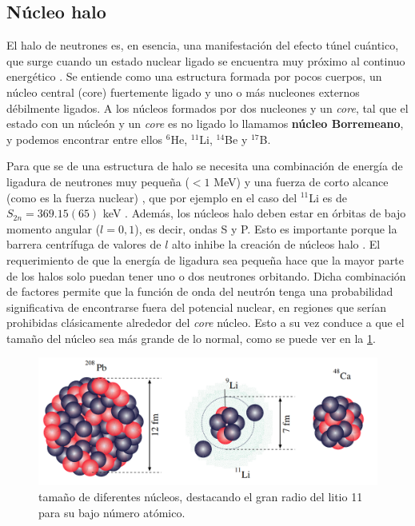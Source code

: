 \subsection{Núcleo halo}


El halo de neutrones es, en esencia, una manifestación del efecto túnel cuántico, que surge cuando un estado nuclear ligado se encuentra muy próximo al continuo energético \cite{tanihata2023halo}.  Se entiende como una estructura formada por pocos cuerpos, un núcleo central (core) fuertemente ligado y uno o más nucleones externos débilmente ligados. A los núcleos formados por dos nucleones y un \textit{core}, tal que el estado con un núcleón y un \textit{core} es no ligado \cite{tanihata2023lowEnergyHalo} lo llamamos \textbf{núcleo Borremeano}, y podemos encontrar entre ellos $^6$He, $^{11}$Li, $^{14}$Be y $^{17}$B. 



Para que se de una estructura de halo se necesita una combinación de energía de ligadura de neutrones muy pequeña ($<1$ MeV) y una fuerza de corto alcance (como es la fuerza nuclear) \cite{tanihata2023halo}, que por ejemplo en el caso del $^{11}$Li es de $S_{2n}=369.15(65)$ keV \cite{PhysRevLett.101.202501}. Además, los núcleos halo deben estar en órbitas de bajo momento angular ($l =0,1$), es decir, ondas S y P. Esto es importante porque la barrera centrífuga de valores de $l$ alto inhibe la creación de núcleos halo \cite{tanihata2023halo}. El requerimiento de que la energía de ligadura sea pequeña hace que la mayor parte de los halos solo puedan tener uno o dos neutrones orbitando. Dicha combinación de factores permite que la función de onda del neutrón tenga una probabilidad significativa de encontrarse fuera del potencial nuclear, en regiones que serían prohibidas clásicamente alrededor del \textit{core} núcleo. Esto a su vez conduce a que el tamaño del núcleo sea más grande de lo normal, como se puede ver en la \cref{fig:02-radio_litio11}.

\begin{figure}[H]
    \centering
    \includegraphics[width=0.9\linewidth]{Imagenes/Litio11.png}
    \caption{tamaño de diferentes núcleos, destacando el gran radio del litio 11 para su bajo número atómico.}
    \label{fig:02-radio_litio11}
\end{figure}

